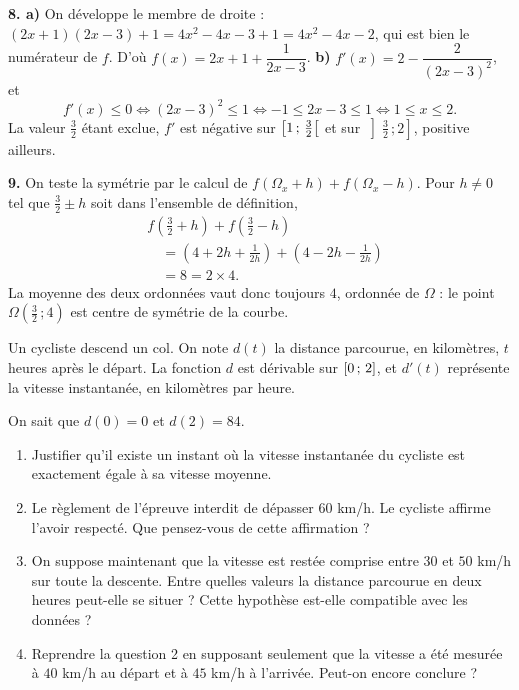 \begin{corrige}[annales]
\textbf{8. a)} On développe le membre de droite :
$(2x+1)(2x-3)+1 = 4x^{2}-4x-3+1 = 4x^{2}-4x-2$, qui est bien le numérateur de
$f$. D'où $f(x) = 2x+1+\dfrac{1}{2x-3}$.
\textbf{b)} $f'(x) = 2-\dfrac{2}{(2x-3)^{2}}$, et
\[
  f'(x) \leq 0
  \iff (2x-3)^{2} \leq 1
  \iff -1 \leq 2x-3 \leq 1
  \iff 1 \leq x \leq 2 .
\]
La valeur $\frac32$ étant exclue, $f'$ est négative sur
$\left[1\,;\,\frac32\right[$ et sur $\left]\frac32\,;2\right]$, positive
ailleurs.

\textbf{9.} On teste la symétrie par le calcul de $f(\Omega_{x}+h)+f(\Omega_{x}-h)$.
Pour $h \neq 0$ tel que $\frac32 \pm h$ soit dans l'ensemble de définition,
\[\begin{aligned}
&f\!\left(\tfrac32+h\right)+f\!\left(\tfrac32-h\right)\\
  &\quad = \left(4+2h+\frac{1}{2h}\right)+\left(4-2h-\frac{1}{2h}\right)
  \\ &\quad = 8 = 2\times4 .
\end{aligned}\]
La moyenne des deux ordonnées vaut donc toujours $4$, ordonnée de $\Omega$ :
le point $\Omega\left(\frac32\,;4\right)$ est centre de symétrie de la courbe.
\end{corrige}

\begin{jecherche}
Un cycliste descend un col. On note $d(t)$ la distance parcourue, en
kilomètres, $t$ heures après le départ. La fonction $d$ est dérivable sur
$\left[0\,;\,2\right]$, et $d'(t)$ représente la vitesse instantanée, en
kilomètres par heure.

On sait que $d(0) = 0$ et $d(2) = 84$.

\begin{enumerate}[label=\textbf{\arabic*.}, leftmargin=*, itemsep=0.3em]
  \item Justifier qu'il existe un instant où la vitesse instantanée du
        cycliste est exactement égale à sa vitesse moyenne.
  \item Le règlement de l'épreuve interdit de dépasser $60$ km/h. Le cycliste
        affirme l'avoir respecté. Que pensez-vous de cette affirmation ?
  \item On suppose maintenant que la vitesse est restée comprise entre
        $30$ et $50$ km/h sur toute la descente. Entre quelles valeurs la
        distance parcourue en deux heures peut-elle se situer ? Cette
        hypothèse est-elle compatible avec les données ?
  \item Reprendre la question 2 en supposant seulement que la vitesse a été
        mesurée à $40$ km/h au départ et à $45$ km/h à l'arrivée. Peut-on
        encore conclure ?
\end{enumerate}
\end{jecherche}

